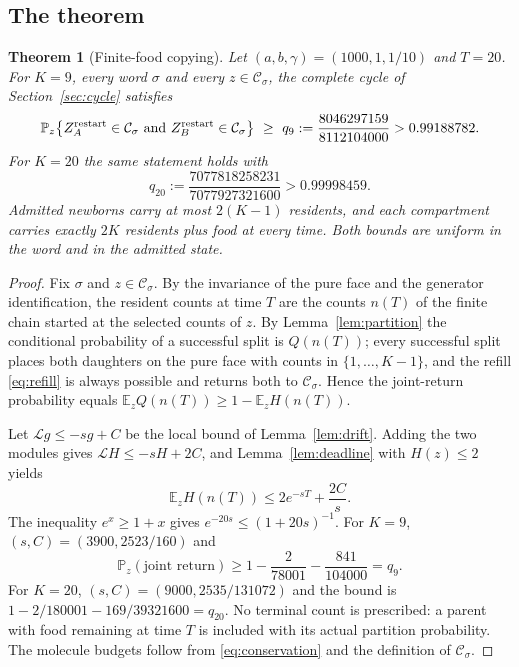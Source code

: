\documentclass[11pt,a4paper]{article}
\theoremstyle{plain}
\newtheorem{theorem}{Theorem}[section]
\theoremstyle{definition}
\theoremstyle{remark}
\newcommand{\PP}{\mathbb P}
\newcommand{\EE}{\mathbb E}
\newcommand{\cL}{\mathcal L}
\newcommand{\cC}{\mathcal C}
\begin{document}
\subsection{The theorem}
\begin{theorem}[Finite-food copying]\label{thm:main}
Let $(a,b,\gamma)=(1000,1,1/10)$ and $T=20$. For $K=9$, every word $\sigma$ and every $z\in\cC_\sigma$, the complete cycle of Section~\ref{sec:cycle} satisfies
\begin{equation}\label{eq:q9}
 \PP_z\bigl\{Z_A^{\rm restart}\in\cC_\sigma\ \text{and}\ Z_B^{\rm restart}\in\cC_\sigma\bigr\}
 \ \ge\ q_9:=\frac{8046297159}{8112104000}>0.99188782 .
\end{equation}
For $K=20$ the same statement holds with
\begin{equation}\label{eq:q20}
 q_{20}:=\frac{7077818258231}{7077927321600}>0.99998459 .
\end{equation}
Admitted newborns carry at most $2(K-1)$ residents, and each compartment carries exactly $2K$ residents plus food at every time. Both bounds are uniform in the word and in the admitted state.
\end{theorem}
\begin{proof}
Fix $\sigma$ and $z\in\cC_\sigma$. By the invariance of the pure face and the generator identification, the resident counts at time $T$ are the counts $n(T)$ of the finite chain started at the selected counts of $z$. By Lemma~\ref{lem:partition} the conditional probability of a successful split is $Q(n(T))$; every successful split places both daughters on the pure face with counts in $\{1,\dots,K-1\}$, and the refill \eqref{eq:refill} is always possible and returns both to $\cC_\sigma$. Hence the joint-return probability equals $\EE_zQ(n(T))\ge1-\EE_zH(n(T))$.

Let $\cL g\le-sg+C$ be the local bound of Lemma~\ref{lem:drift}. Adding the two modules gives $\cL H\le-sH+2C$, and Lemma~\ref{lem:deadline} with $H(z)\le2$ yields
\[
 \EE_zH(n(T))\le2e^{-sT}+\frac{2C}{s}.
\]
The inequality $e^x\ge1+x$ gives $e^{-20s}\le(1+20s)^{-1}$. For $K=9$, $(s,C)=(3900,2523/160)$ and
\[
 \PP_z(\text{joint return})\ge1-\frac2{78001}-\frac{841}{104000}=q_9 .
\]
For $K=20$, $(s,C)=(9000,2535/131072)$ and the bound is $1-2/180001-169/39321600=q_{20}$. No terminal count is prescribed: a parent with food remaining at time $T$ is included with its actual partition probability. The molecule budgets follow from \eqref{eq:conservation} and the definition of $\cC_\sigma$.
\end{proof}
\end{document}
